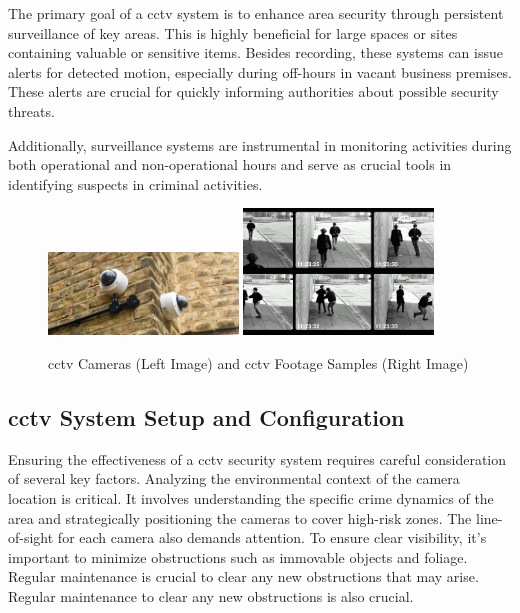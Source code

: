 The primary goal of a \ac{cctv} system is to enhance area security through persistent surveillance of key areas. This 
is highly beneficial for large spaces or sites containing valuable or sensitive items. Besides recording, these systems 
can issue alerts for detected motion, especially during off-hours in vacant business premises. These alerts are crucial 
for quickly informing authorities about possible security threats. 

Additionally, surveillance systems are instrumental 
in monitoring activities during both operational and non-operational hours and serve as crucial tools in identifying 
suspects in criminal activities.
\begin{figure}[h]
    \centering
    \includegraphics[width=0.45\textwidth]{figs/cctv.jpg}
    \hfill
    \includegraphics[width=0.45\textwidth]{figs/cctv-footage.png}
    \caption{\ac{cctv} Cameras (Left Image) and \ac{cctv} Footage Samples (Right Image)}
    \label{fig:cctv-and-footage}
\end{figure}

\subsection{\ac{cctv} System Setup and Configuration}
Ensuring the effectiveness of a \ac{cctv} security system requires careful consideration of several key factors. Analyzing the environmental context of the camera location is critical. It involves understanding the specific crime dynamics of the area and strategically positioning the cameras to cover high-risk zones. The line-of-sight for each camera also demands attention. To ensure clear visibility, it's important to minimize obstructions such as immovable objects and foliage. Regular maintenance is crucial to clear any new obstructions that may arise. Regular maintenance to clear any new obstructions is also crucial. 

